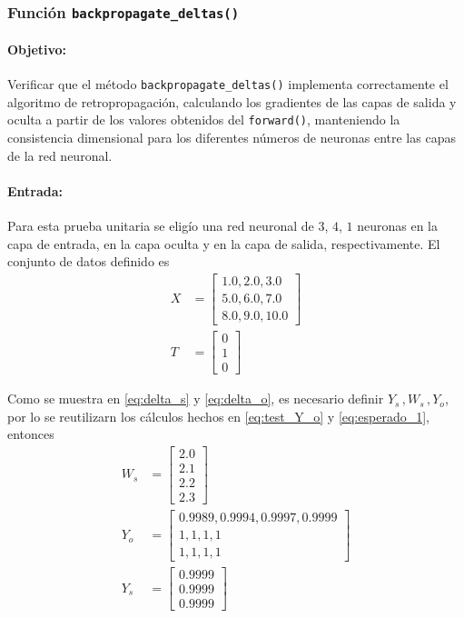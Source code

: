 \documentclass[11pt,a4paper]{article}
\begin{document}
\subsubsection{Función \texttt{backpropagate\_deltas()}}

\paragraph{Objetivo:} Verificar que el método \texttt{backpropagate\_deltas()} implementa correctamente el algoritmo de retropropagación, calculando los gradientes de las capas de salida y oculta a partir de los valores obtenidos del \texttt{forward()}, manteniendo la consistencia dimensional para los diferentes números de neuronas entre las capas de la red neuronal.

\paragraph{Entrada:} Para esta prueba unitaria se eligío una red neuronal de $3$, $4$, $1$ neuronas en la capa de entrada, en la capa oculta y en la capa de salida, respectivamente. El conjunto de datos definido es
\begin{align}
  X &= 
  \begin{bmatrix} 
      1.0, 2.0, 3.0 \\
      5.0, 6.0, 7.0 \\
      8.0, 9.0, 10.0
  \end{bmatrix} \\
  T &= 
  \begin{bmatrix}
    0 \\
    1 \\
    0
  \end{bmatrix}  
\end{align}

Como se muestra en \cref{eq:delta_s}  y \cref{eq:delta_o}, es necesario definir $Y_s \,, W_s \,, Y_o$, por lo se reutilizarn los cálculos hechos en \cref{eq:test_Y_o} y \cref{eq:esperado_1}, entonces
\begin{align}
  W_s &=
  \begin{bmatrix}
    2.0 \\
    2.1 \\
    2.2 \\
    2.3    
  \end{bmatrix} \\
  Y_o &=
  \begin{bmatrix}
    0.9989, 0.9994, 0.9997, 0.9999 \\
    1, 1, 1, 1 \\
    1, 1, 1, 1
  \end{bmatrix} \\
  Y_s &= 
  \begin{bmatrix}
    0.9999 \\
    0.9999 \\
    0.9999
  \end{bmatrix}
\end{align}
\end{document}
